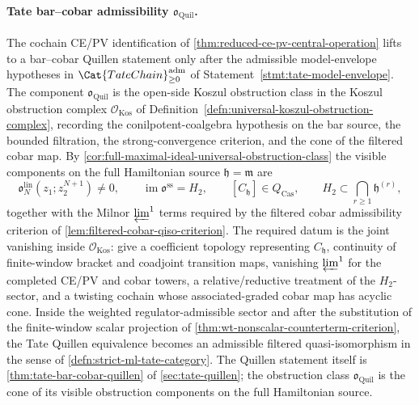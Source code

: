 \documentclass[11pt]{memoir}
\begin{document}


\paragraph{\texorpdfstring{Tate bar--cobar admissibility \(\mathfrak o_{\mathrm{Quil}}\).}{Tate bar-cobar admissibility o-Quil.}}
The cochain CE/PV identification of
\ref{thm:reduced-ce-pv-central-operation} lifts to a bar--cobar
Quillen statement only after the admissible model-envelope hypotheses in
\(\Cat{TateChain}_{\geq0}^{\mathrm{adm}}\) of
Statement~\ref{stmt:tate-model-envelope}.  The component
\(\mathfrak o_{\mathrm{Quil}}\) is the open-side Koszul obstruction
class in the Koszul obstruction complex
\(\mathcal O_{\mathrm{Kos}}\) of
Definition~\ref{defn:universal-koszul-obstruction-complex}, recording
the conilpotent-coalgebra hypothesis on the bar source, the bounded
	filtration, the strong-convergence criterion, and the cone of the
filtered cobar map.  By
\ref{cor:full-maximal-ideal-universal-obstruction-class} the visible
components on the full Hamiltonian source \(\mathfrak h=\mathfrak m\)
are
\[
  \mathfrak o^{\mathrm{lin}}_N(z_1;z_2^{N+1})\neq0,\qquad
  \operatorname{im}\mathfrak o^{\mathrm{ss}}=H_2,\qquad
  [C_{\mathfrak h}]\in Q_{\mathrm{Cas}},\qquad
  H_2\subset\bigcap_{r\geq1}\mathfrak h^{(r)},
\]
together with the Milnor \(\varprojlim^1\) terms required by the
filtered cobar admissibility criterion of
\ref{lem:filtered-cobar-qiso-criterion}.  The required datum is the
joint vanishing inside \(\mathcal O_{\mathrm{Kos}}\): give a
coefficient topology representing \(C_{\mathfrak h}\), continuity of
finite-window bracket and coadjoint transition maps, vanishing
\(\varprojlim^1\) for the completed CE/PV and cobar towers, a
relative/reductive treatment of the \(H_2\)-sector, and a twisting
cochain whose associated-graded cobar map has acyclic cone.  Inside the
weighted regulator-admissible sector and after the substitution of the
finite-window scalar projection of
\ref{thm:wt-nonscalar-counterterm-criterion}, the Tate Quillen
equivalence becomes an admissible filtered quasi-isomorphism in the
sense of \ref{defn:strict-ml-tate-category}.  The Quillen statement
itself is \ref{thm:tate-bar-cobar-quillen} of \ref{sec:tate-quillen};
the obstruction class \(\mathfrak o_{\mathrm{Quil}}\) is the cone of
its visible obstruction components on the full Hamiltonian source.
\end{document}
